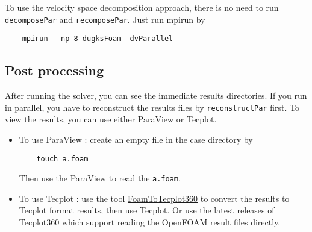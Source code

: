To use the velocity space decomposition approach, there is no need to run \verb|decomposePar| and \verb|recomposePar|.
Just run mpirun by
\begin{verbatim}
    mpirun  -np 8 dugksFoam -dvParallel
\end{verbatim}

\subsection{Post processing}
After running the solver, you can see the immediate results directories.
If you run in parallel, you have to reconstruct the results files by \verb|reconstructPar| first.
To view the results, you can use either ParaView or Tecplot.
\begin{itemize}
\item To use ParaView : create an empty file in the case directory by
\begin{verbatim}
    touch a.foam
\end{verbatim}
Then use the ParaView to read the \verb|a.foam|.
\item To use Tecplot : use the tool \href{https://openfoamwiki.net/index.php/FoamToTecplot360}{FoamToTecplot360} to convert the results to Tecplot format results, then use Tecplot.
 Or use the latest releases of Tecplot360 which support reading the OpenFOAM result files directly.
\end{itemize}
